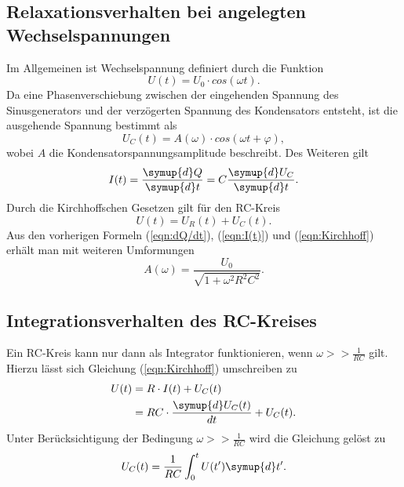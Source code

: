 \subsection{Relaxationsverhalten bei angelegten Wechselspannungen}
Im Allgemeinen ist Wechselspannung definiert durch die Funktion
\begin{equation*}
    U(t)=U_0 \cdot cos(\omega t).
\end{equation*}
Da eine Phasenverschiebung zwischen der eingehenden Spannung des Sinusgenerators und der verzögerten Spannung des Kondensators entsteht,
ist die ausgehende Spannung bestimmt als
\begin{equation*}
    U_{C}(t)=A(\omega)\cdot cos(\omega t +\varphi),
\end{equation*}
wobei $A$ die Kondensatorspannungsamplitude beschreibt.
Des Weiteren gilt
\begin{equation}
    \label{eqn:I(t)}
    I(t)=\frac{\symup{d}Q}{\symup{d}t}=C\frac{\symup{d}U_C}{\symup{d}t}.
\end{equation}
Durch die Kirchhoffschen Gesetzen gilt für den RC-Kreis
\begin{equation}
    \label{eqn:Kirchhoff}
    U(t)=U_{R}(t)+U_{C}(t).
\end{equation}
Aus den vorherigen Formeln (\ref{eqn:dQ/dt}), (\ref{eqn:I(t)}) und (\ref{eqn:Kirchhoff}) erhält man mit weiteren Umformungen
\begin{equation}
    \label{eqn:Amplitude}
    A(\omega)=\frac{U_0}{\sqrt{1+\omega^2 R^2 C^2}}.
\end{equation}


\subsection{Integrationsverhalten des RC-Kreises}
\label{subsec:int}
Ein RC-Kreis kann nur dann als Integrator funktionieren, wenn $\omega >> \frac{1}{RC}$ gilt.
Hierzu lässt sich Gleichung (\ref{eqn:Kirchhoff}) umschreiben zu
\begin{align*}
    U(t)&=R \cdot I(t)+U_{C}(t)\\
        &=RC\cdot \frac{\symup{d}U_{C}(t)}{dt}+U_{C}(t).
\end{align*}
Unter Berücksichtigung der Bedingung $\omega >>\frac{1}{RC}$ wird die Gleichung gelöst zu
\begin{equation}
    \label{eqn:Kondensatorspannung}
    U_{C}(t)=\frac{1}{RC}\int_{0}^{t} U(t')\symup{d}t'.
\end{equation}